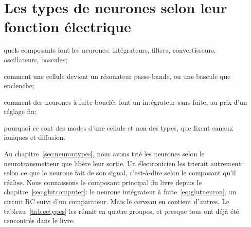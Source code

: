 \chapter{Les types de neurones selon leur fonction électrique}
\label{sec:eetypes}
\begin{chaptergoals}
\item quels composants font les neurones: intégrateurs, filtres, convertisseurs, oscillateurs, bascules;
\item comment une cellule devient un résonateur passe-bande, ou une bascule que  enclenche;
\item comment des neurones à fuite bouclés font un intégrateur sans fuite, au prix d'un réglage fin;
\item pourquoi ce sont des modes d'une cellule et non des types, que fixent canaux ioniques et diffusion.
\end{chaptergoals}

Au chapitre~\ref{sec:neurontypes}, nous avons trié les neurones selon le neurotransmetteur que libère leur sortie. Un électronicien les trierait autrement: selon ce que le neurone fait de son signal, c'est-à-dire selon le composant qu'il réalise. Nous connaissons le composant principal du livre depuis le chapitre~\ref{sec:glutcomputer}: le neurone intégrateur à fuite~\eqref{eq:glutneuron}, un circuit RC suivi d'un comparateur. Mais le cerveau en contient d'autres. Le tableau~\ref{tab:eetypes} les réunit en quatre groupes, et presque tous ont déjà été rencontrés dans le livre.

